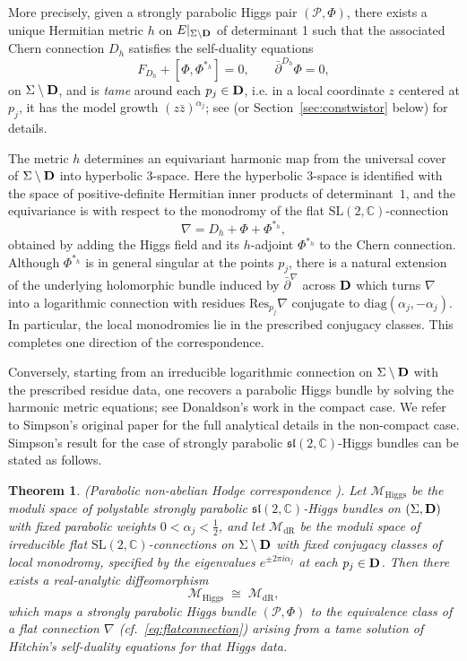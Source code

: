 \documentclass[12pt,a4paper]{amsart}
\newtheorem{theorem}{Theorem}[section]
\theoremstyle{definition}
\theoremstyle{remark}
\newcommand{\C}{\mathbb C}
\newcommand{\Res}{\mathrm{Res}}
\newcommand{\Mcal}{\mathcal M}
\newcommand{\Pcal}{\mathcal P}
\begin{document}
More precisely, given a strongly parabolic Higgs pair $(\Pcal,\Phi)$, there exists a unique Hermitian metric $h$ on $E|_{\Sigma\setminus{\bf D}}$ of determinant 1 such that the associated Chern connection $D_h$ satisfies the self-duality equations
\[ F_{D_h} + [\Phi,\Phi^{*_h} ]= 0, \qquad \bar\partial^{D_h}\Phi = 0,
\]
on $\Sigma\setminus{\bf D}$,
and is {\em tame}
 around each $p_j\in{\bf D}$, i.e. in a local coordinate $z$ centered at $p_j$, it has the model growth $(z\bar z)^{\alpha_j}$; see  \cite[Section 2]{Sim2} (or Section~\ref{sec:constwistor} below) for details.


The metric $h$ determines an equivariant harmonic map from the universal cover of $\Sigma\setminus{\bf D}$ into hyperbolic $3$-space.
Here the hyperbolic $3$-space is identified with the space of positive-definite Hermitian inner products of determinant~$1$, and the equivariance is with respect to the monodromy of the flat $\mathrm{SL}(2,\C)$-connection
\begin{equation}\label{eq:flatconnection} \nabla = D_h + \Phi + \Phi^{*_h},\end{equation}
obtained by adding the Higgs field and its $h$-adjoint $\Phi^{*_h}$ to the Chern connection.
Although $\Phi^{*_h}$ is in general singular at the points $p_j$, there is a natural extension 
of the underlying holomorphic bundle induced by $\bar\partial^\nabla$ across ${\bf D}$ which turns $\nabla$ into a logarithmic connection with residues $\Res_{p_j}\nabla$ conjugate to $\mathrm{diag}(\alpha_j,-\alpha_j)$.
In particular, 
the local monodromies lie in the prescribed conjugacy classes. This completes one direction of the correspondence.

Conversely, starting from an irreducible logarithmic connection on $\Sigma\setminus{\bf D}$ with the prescribed residue data, one recovers a parabolic Higgs bundle by solving the harmonic metric equations; see Donaldson's work \cite{Donald} in the compact case.
We refer to Simpson's original paper \cite{Sim2} for the full analytical details in the non-compact case. Simpson's result 
for the case of strongly parabolic $\mathfrak{sl}(2,\C)$-Higgs bundles
can be stated as follows.




\begin{theorem}\label{the:NAH}
(Parabolic non-abelian Hodge correspondence \cite{Sim2}).
Let $\Mcal_{\mathrm{Higgs}}$ be the moduli space of polystable strongly parabolic
$\mathfrak{sl}(2,\C)$-Higgs bundles on $(\Sigma,{\bf D})$ with fixed parabolic weights
$0<\alpha_j<\tfrac12$, and let $\Mcal_{\mathrm{dR}}$ be the moduli space of irreducible flat
$\mathrm{SL}(2,\C)$-connections on $\Sigma\setminus{\bf D}$ with fixed conjugacy classes of
local monodromy, specified by the eigenvalues $e^{\pm 2\pi i \alpha_j}$ at each $p_j\in{\bf D}$.
Then there exists a real-analytic diffeomorphism
\[
\Mcal_{\mathrm{Higgs}} \;\cong\; \Mcal_{\mathrm{dR}},
\]
which maps a strongly parabolic Higgs bundle $(\Pcal,\Phi)$ to the equivalence class of a
flat connection $\nabla$ (cf.~\eqref{eq:flatconnection}) arising from a tame solution of
Hitchin's self-duality equations for that Higgs data.
\end{theorem}
\end{document}

